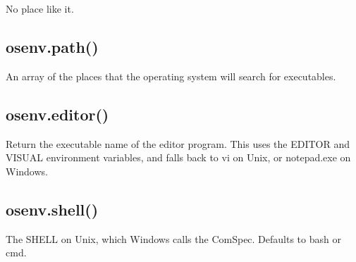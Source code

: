 No place like it.

\subsection*{osenv.\+path()}

An array of the places that the operating system will search for executables.

\subsection*{osenv.\+editor()}

Return the executable name of the editor program. This uses the E\+D\+I\+T\+O\+R and V\+I\+S\+U\+A\+L environment variables, and falls back to {\ttfamily vi} on Unix, or {\ttfamily notepad.\+exe} on Windows.

\subsection*{osenv.\+shell()}

The S\+H\+E\+L\+L on Unix, which Windows calls the Com\+Spec. Defaults to \textquotesingle{}bash\textquotesingle{} or \textquotesingle{}cmd\textquotesingle{}. 
